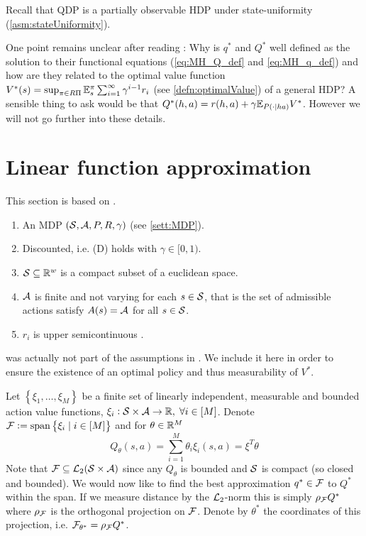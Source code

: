 Recall that QDP is a partially observable HDP under state-uniformity
(\cref{asm:stateUniformity}).

One point remains unclear after reading :
Why is $q^*$ and $Q^*$ well defined as the solution to their
functional equations (\cref{eq:MH_Q_def} and \cref{eq:MH_q_def})
and how are they related to the optimal value function
$V^*(s) = \sup_{\pi \in R\Pi} \mathbb{E}_s^\pi
\sum_{i=1}^\infty \gamma^{i-1} r_i $
(see \cref{defn:optimalValue})
of a general HDP?
A sensible thing to ask would be that
$Q^*(h, a) = r(h, a) + \gamma \mathbb{E}_{P(\cdot \mid h a)} V^*$.
However we will not go further into these details.

\section{Linear function approximation} \label{sec:linearFunctionApprox}

This section is based on .

\begin{sett}
  \leavevmode
  \begin{enumerate}
    \item An MDP $(\mathcal{S}, \mathcal{A}, P, R, \gamma)$ (see \cref{sett:MDP}).
    \item Discounted, i.e. (D) holds with $\gamma \in [0,1)$.
    \item $\mathcal{S} \subseteq \mathbb{R}^w$ is a compact subset of a euclidean space.
    \item $\mathcal{A}$ is finite and not varying for each $s \in \mathcal{S}$, that
      is the set of admissible actions satisfy $A(s) = \mathcal{A}$ for all 
      $s \in \mathcal{S}$.
    \item $r_i$ is upper semicontinuous \label{item:MRlast}.
  \end{enumerate}
  \label{sett:MR}
\end{sett}

\begin{rem}
   was actually not part of the assumptions in
  .
  We include it here in order to ensure the existence of an
  optimal policy and thus measurability of $V^*$.
\end{rem}

Let $\left\{ \xi_1, \dots, \xi_M \right\}$ be a finite set of linearly
independent, measurable and bounded action value functions,
$\xi_i : \mathcal{S} \times \mathcal{A} \to \mathbb{R},\; \forall i \in [M]$.
Denote $\mathcal{F} \vcentcolon= \mathrm{span}\left\{ \xi_i \mid i \in [M] \right\}$
and for $\theta \in \mathbb{R}^M$
\[ Q_\theta(s, a) = \sum_{i=1}^M \theta_i \xi_i(s, a) = \xi^T \theta \]
Note that $\mathcal{F} \subseteq \mathcal{L}_2(\mathcal{S}\times\mathcal{A})$ since any
$Q_\theta$ is bounded and $\mathcal{S}$ is compact (so closed and bounded).
We would now like to find the best approximation
$q^* \in \mathcal{F}$ to $Q^*$ within the span.
If we measure distance by the $\mathcal{L}_2$-norm this is
simply $\rho_\mathcal{F} Q^*$ where $\rho_\mathcal{F}$ is the orthogonal projection on
$\mathcal{F}$. Denote by $\theta^*$ the coordinates of this projection, i.e.
$\mathcal{F}_{\theta^*} = \rho_\mathcal{F} Q^*$.

